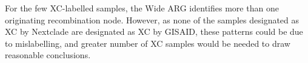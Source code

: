 \documentclass{article}
\begin{document}
For the few XC-labelled samples, the Wide ARG identifies more than one
originating recombination node. However, as none of the samples designated as
XC by Nextclade are designated as XC by GISAID, these patterns could be due to
mislabelling, and greater number of XC samples would be needed to draw reasonable
conclusions.



\end{document}
